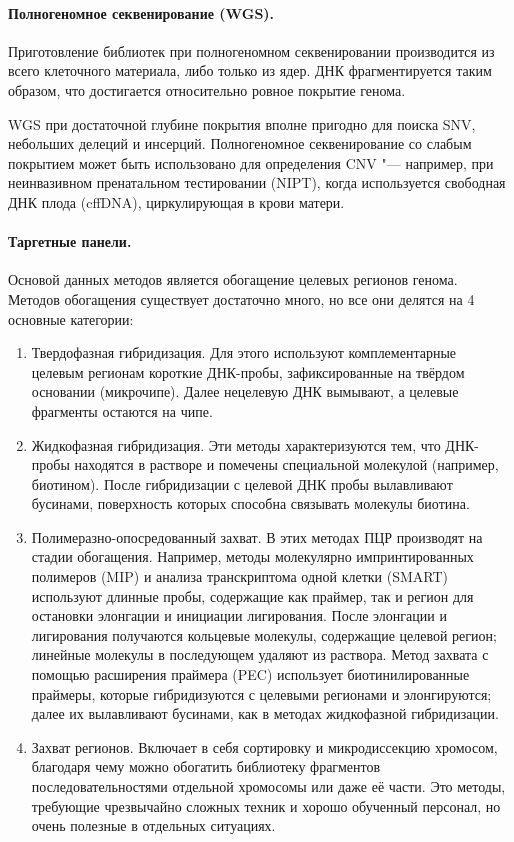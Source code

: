 \documentclass[a4paper,12pt]{article}
\begin{document}
\paragraph{Полногеномное секвенирование (WGS).}
Приготовление библиотек при полногеномном секвенировании производится из всего клеточного материала, либо только из ядер.
ДНК фрагментируется таким образом, что достигается относительно ровное покрытие генома.

WGS при достаточной глубине покрытия вполне пригодно для поиска SNV, небольших делеций и инсерций.
Полногеномное секвенирование со слабым покрытием может быть использовано для определения CNV "--- например, при неинвазивном пренатальном тестировании (NIPT), когда используется свободная ДНК плода (cffDNA), циркулирующая в крови матери\cite{Yu_2019}.

\paragraph{Таргетные панели.}
Основой данных методов является обогащение целевых регионов генома.
Методов обогащения существует достаточно много, но все они делятся на 4 основные категории\cite{Teer_2010}:

\begin{enumerate}
\item Твердофазная гибридизация.
Для этого используют комплементарные целевым регионам короткие ДНК-пробы, зафиксированные на твёрдом основании (микрочипе).
Далее нецелевую ДНК вымывают, а целевые фрагменты остаются на чипе.
\item Жидкофазная гибридизация.
Эти методы характеризуются тем, что ДНК-пробы находятся в растворе и помечены специальной молекулой (например, биотином).
После гибридизации с целевой ДНК пробы вылавливают бусинами, поверхность которых способна связывать молекулы биотина.
\item Полимеразно-опосредованный захват.
В этих методах ПЦР производят на стадии обогащения.
Например, методы молекулярно импринтированных полимеров (MIP) и анализа транскриптома одной клетки (SMART) используют длинные пробы, содержащие как праймер, так и регион для остановки элонгации и инициации лигирования.
После элонгации и лигирования получаются кольцевые молекулы, содержащие целевой регион;
линейные молекулы в последующем удаляют из раствора.
Метод захвата с помощью расширения праймера (PEC) использует биотинилированные праймеры, которые гибридизуются с целевыми регионами и элонгируются;
далее их вылавливают бусинами, как в методах жидкофазной гибридизации.
\item Захват регионов.
Включает в себя сортировку и микродиссекцию хромосом, благодаря чему можно обогатить библиотеку фрагментов последовательностями отдельной хромосомы или даже её части.
Это методы, требующие чрезвычайно сложных техник и хорошо обученный персонал, но очень полезные в отдельных ситуациях.
\end{enumerate}
\end{document}
